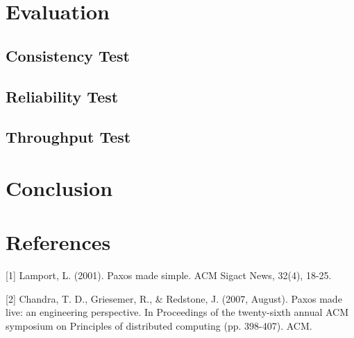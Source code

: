 \documentclass[11pt]{article}
\begin{document}
\section{Evaluation}
\label{sec:eval}
\subsection{Consistency Test}
\subsection{Reliability Test}
\subsection{Throughput Test}

\section{Conclusion}
\label{sec:conclusion}


\section{References}

[1] Lamport, L. (2001). Paxos made simple. ACM Sigact News, 32(4), 18-25.

[2] Chandra, T. D., Griesemer, R., \& Redstone, J. (2007, August). Paxos made live: an engineering perspective. In Proceedings of the twenty-sixth annual ACM symposium on Principles of distributed computing (pp. 398-407). ACM.
\end{document}
